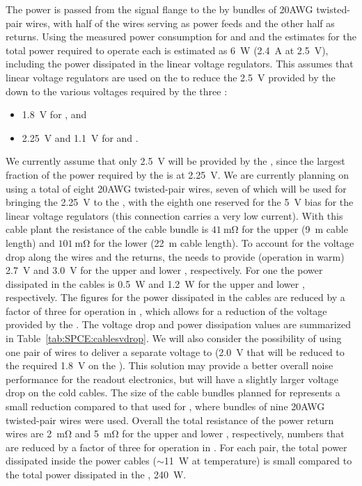 The  power is passed from the signal flange to the
 by bundles of \num{20}AWG twisted-pair wires, with half of
the wires serving as power feeds and the other half as returns.
Using the measured power consumption for  and 
and the estimates for  the total power required to
operate each  is estimated as \SI{6}{W} (\SI{2.4}{A}
at \SI{2.5}{V}), including the power dissipated in the linear voltage
regulators. This assumes that linear voltage regulators are
used on the  to reduce the \SI{2.5}{V} provided by the
 down to the various voltages required by the three
:
\begin{itemize}
\item \SI{1.8}{V} for , and
\item \SI{2.25}{V} and \SI{1.1}{V} for  and .
\end{itemize}
We currently assume that only \SI{2.5}{V} will be provided by the 
, since the largest fraction of the power required by
the  is at \SI{2.25}{V}. We are currently planning on using 
a total of eight \num{20}AWG twisted-pair wires, seven of which will be used
for bringing the \SI{2.25}{V} to the , with the eighth
one reserved for the \SI{5}{V} bias for the linear voltage regulators
(this connection carries a very low current). With this cable plant the
resistance of the cable bundle is $\SI{41}{\milli\ohm}$ for the upper 
 (\SI{9}{m} cable length) and $\SI{101}{\milli\ohm}$ for
the lower  (\SI{22}{m} cable length). To account for the
voltage drop along the wires and the returns, the  needs to
provide (operation in warm) \SI{2.7}{V} and \SI{3.0}{V} for the upper
and lower , respectively. For one  the power
dissipated in the cables is \SI{0.5}{W} and \SI{1.2}{W} for the upper
and lower , respectively. The figures for the power 
dissipated in the cables are reduced by a factor of three for operation
in , which allows for a reduction of the voltage 
provided by the . The voltage drop and power dissipation
values are summarized in Table~\ref{tab:SPCE:cablesvdrop}.
We will also consider the possibility of using one pair of wires to
deliver a separate voltage to  (\SI{2.0}{V} that will be reduced to
the required \SI{1.8}{V} on the ). This solution may
provide a better overall noise performance for the readout electronics,
but will have a slightly larger voltage drop on the cold cables.
The size of the cable bundles planned
for  represents a small reduction compared to that used
for , where bundles of nine \num{20}AWG twisted-pair wires
were used. Overall the total resistance of the power return wires
are \SI{2}{\milli\ohm} and \SI{5}{\milli\ohm} for the upper and
lower , respectively, numbers that are reduced by 
a factor of three for operation in . For each  pair, the total power 
dissipated inside the power cables ($\sim$\SI{11}{W} at  temperature)
is small compared to the total power dissipated in the ,
\SI{240}{W}.

